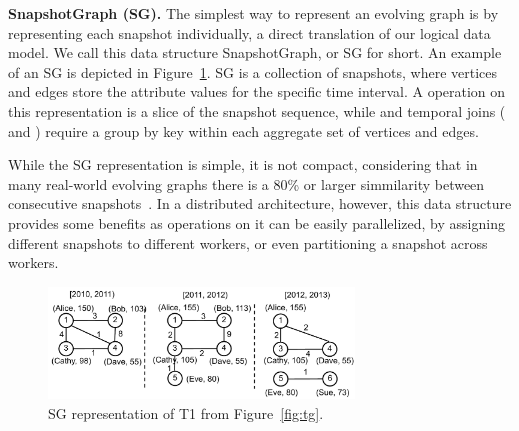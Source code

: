 {\bf SnapshotGraph (SG).} The simplest way to represent an evolving
graph is by representing each snapshot individually, a direct
translation of our logical data model.  We call this data structure
SnapshotGraph, or SG for short. An example of an SG is depicted in
Figure~\ref{fig:sgp}.  SG is a collection of snapshots, where vertices
and edges store the attribute values for the specific time interval.
A  operation on this representation is a slice of the
snapshot sequence, while  and temporal joins
( and ) require a group by key within each
aggregate set of vertices and edges.

While the SG representation is simple, it is not compact, considering
that in many real-world evolving graphs there is a 80\% or larger
simmilarity between consecutive
snapshots~\cite{DBLP:journals/tos/MiaoHLWYZPCC15}.  In a distributed
architecture, however, this data structure provides some benefits as
operations on it can be easily parallelized, by assigning different
snapshots to different workers, or even partitioning a snapshot across
workers.  

\begin{figure}[t!]
\includegraphics[width=3.2in]{figs/sgp.pdf}
\caption{SG representation of T1 from Figure~\ref{fig:tg}.}
\label{fig:sgp}
\end{figure}

